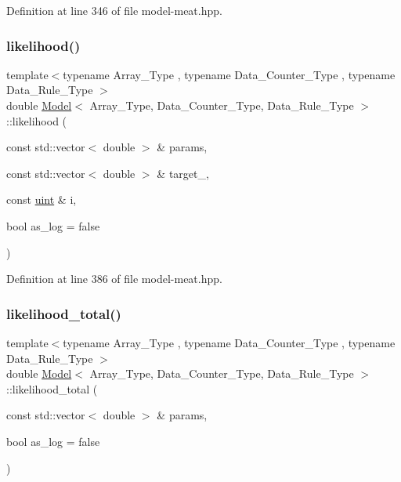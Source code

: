 Definition at line 346 of file model-\/meat.\+hpp.

\mbox{\label{class_model_ab88f541fc010f0ee1a415c9cb6c292b7}} 
\subsubsection{\texorpdfstring{likelihood()}{likelihood()}\hspace{0.1cm}{\footnotesize\ttfamily [3/3]}}
{\footnotesize\ttfamily template$<$typename Array\+\_\+\+Type , typename Data\+\_\+\+Counter\+\_\+\+Type , typename Data\+\_\+\+Rule\+\_\+\+Type $>$ \\
double \hyperlink{class_model}{Model}$<$ Array\+\_\+\+Type, Data\+\_\+\+Counter\+\_\+\+Type, Data\+\_\+\+Rule\+\_\+\+Type $>$\+::likelihood (\begin{DoxyParamCaption}\item[{const std\+::vector$<$ double $>$ \&}]{params,  }\item[{const std\+::vector$<$ double $>$ \&}]{target\+\_\+,  }\item[{const \hyperlink{typedefs_8hpp_a91ad9478d81a7aaf2593e8d9c3d06a14}{uint} \&}]{i,  }\item[{bool}]{as\+\_\+log = {\ttfamily false} }\end{DoxyParamCaption})\hspace{0.3cm}{\ttfamily [inline]}}



Definition at line 386 of file model-\/meat.\+hpp.

\mbox{\label{class_model_a31d16ef478d772cedde0813575074a0f}} 
\subsubsection{\texorpdfstring{likelihood\+\_\+total()}{likelihood\_total()}}
{\footnotesize\ttfamily template$<$typename Array\+\_\+\+Type , typename Data\+\_\+\+Counter\+\_\+\+Type , typename Data\+\_\+\+Rule\+\_\+\+Type $>$ \\
double \hyperlink{class_model}{Model}$<$ Array\+\_\+\+Type, Data\+\_\+\+Counter\+\_\+\+Type, Data\+\_\+\+Rule\+\_\+\+Type $>$\+::likelihood\+\_\+total (\begin{DoxyParamCaption}\item[{const std\+::vector$<$ double $>$ \&}]{params,  }\item[{bool}]{as\+\_\+log = {\ttfamily false} }\end{DoxyParamCaption})\hspace{0.3cm}{\ttfamily [inline]}}



